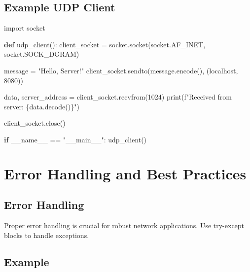 \documentclass[
  letterpaper,
  DIV=11,
  numbers=noendperiod]{scrreprt}
\newenvironment{Shaded}{\begin{snugshade}}{\end{snugshade}}
\newcommand{\BuiltInTok}[1]{\textcolor[rgb]{0.00,0.23,0.31}{#1}}
\newcommand{\ControlFlowTok}[1]{\textcolor[rgb]{0.00,0.23,0.31}{\textbf{#1}}}
\newcommand{\DecValTok}[1]{\textcolor[rgb]{0.68,0.00,0.00}{#1}}
\newcommand{\ImportTok}[1]{\textcolor[rgb]{0.00,0.46,0.62}{#1}}
\newcommand{\KeywordTok}[1]{\textcolor[rgb]{0.00,0.23,0.31}{\textbf{#1}}}
\newcommand{\NormalTok}[1]{\textcolor[rgb]{0.00,0.23,0.31}{#1}}
\newcommand{\OperatorTok}[1]{\textcolor[rgb]{0.37,0.37,0.37}{#1}}
\newcommand{\SpecialCharTok}[1]{\textcolor[rgb]{0.37,0.37,0.37}{#1}}
\newcommand{\SpecialStringTok}[1]{\textcolor[rgb]{0.13,0.47,0.30}{#1}}
\newcommand{\StringTok}[1]{\textcolor[rgb]{0.13,0.47,0.30}{#1}}
\newcommand{\VariableTok}[1]{\textcolor[rgb]{0.07,0.07,0.07}{#1}}
\begin{document}
\subsection{Example UDP Client}\label{example-udp-client-1}

\begin{Shaded}
\begin{Highlighting}[]
\ImportTok{import}\NormalTok{ socket}

\KeywordTok{def}\NormalTok{ udp\_client():}
\NormalTok{    client\_socket }\OperatorTok{=}\NormalTok{ socket.socket(socket.AF\_INET, socket.SOCK\_DGRAM)}

\NormalTok{    message }\OperatorTok{=} \StringTok{"Hello, Server!"}
\NormalTok{    client\_socket.sendto(message.encode(), (}\StringTok{\textquotesingle{}localhost\textquotesingle{}}\NormalTok{, }\DecValTok{8080}\NormalTok{))}

\NormalTok{    data, server\_address }\OperatorTok{=}\NormalTok{ client\_socket.recvfrom(}\DecValTok{1024}\NormalTok{)}
    \BuiltInTok{print}\NormalTok{(}\SpecialStringTok{f"Received from server: }\SpecialCharTok{\{}\NormalTok{data}\SpecialCharTok{.}\NormalTok{decode()}\SpecialCharTok{\}}\SpecialStringTok{"}\NormalTok{)}

\NormalTok{    client\_socket.close()}

\ControlFlowTok{if} \VariableTok{\_\_name\_\_} \OperatorTok{==} \StringTok{"\_\_main\_\_"}\NormalTok{:}
\NormalTok{    udp\_client()}
\end{Highlighting}
\end{Shaded}

\section{Error Handling and Best
Practices}\label{error-handling-and-best-practices}

\subsection{Error Handling}\label{error-handling-3}

Proper error handling is crucial for robust network applications. Use
try-except blocks to handle exceptions.

\subsection{Example}\label{example-75}
\end{document}
